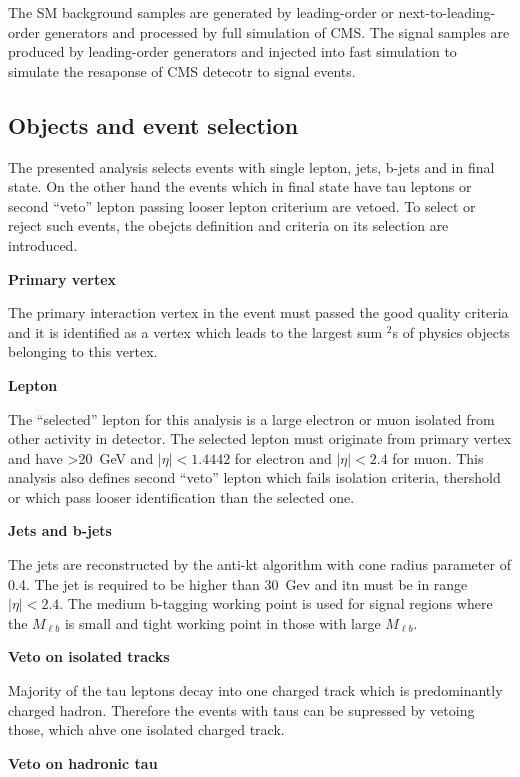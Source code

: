 The SM background samples are generated by leading-order or next-to-leading-order generators and processed by full simulation of CMS. The signal samples are produced by leading-order generators and injected into fast simulation to simulate the resaponse of CMS detecotr to signal events.

\subsection{Objects and event selection~\label{sec:objects}}

The presented analysis selects events with single lepton, jets, b-jets and \MET in final state. On the other hand the events which in final state have tau leptons or second ``veto'' lepton passing looser lepton criterium are vetoed. To select or reject such events, the obejcts definition and criteria on its selection are introduced.

\textbf{Primary vertex}

The primary interaction vertex in the event must passed the good quality criteria and it is identified as a vertex which leads to the largest sum \pt$^{2}$s of physics objects belonging to this vertex.

\textbf{Lepton}

The ``selected'' lepton for this analysis is a large \pt electron or muon isolated from other activity in detector. The selected lepton must originate from primary vertex and have \pt>20~GeV and $|\eta|<1.4442$ for electron and $|\eta|<2.4$ for muon. This analysis also defines second ``veto'' lepton which fails isolation criteria, \pt thershold or which pass looser identification than the selected one. 

\textbf{Jets and b-jets}

The jets are reconstructed by the anti-kt algorithm with cone radius parameter of 0.4. The jet \pt is required to be higher than 30~Gev and itn must be in range $|\eta|<2.4$. The medium b-tagging working point is used for signal regions where the $M_{\ell b}$ is small and tight working point in those with large $M_{\ell b}$.  

\textbf{Veto on isolated tracks}

Majority of the tau leptons decay into one charged track which is predominantly charged hadron. Therefore the events with taus can be supressed by vetoing those, which ahve one isolated charged track.

\textbf{Veto on hadronic tau}

